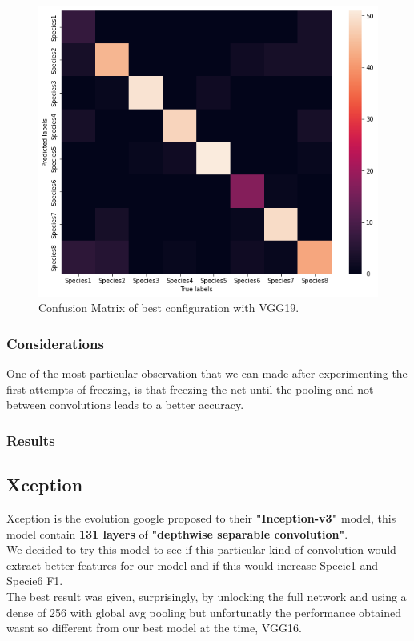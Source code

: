 \documentclass[10pt]{article}
\begin{document}
\begin{figure}[ht]
\begin{center}
\centerline{\includegraphics[width=\columnwidth]{VGG19_best}}
\caption{Confusion Matrix of best configuration with VGG19.}
\label{bayespic}
\end{center}
\end{figure}
\subsubsection{Considerations}
One of the most particular observation that we can made after experimenting the first attempts of freezing, is that freezing the net
until the pooling and not between convolutions leads to a better accuracy.

\subsubsection{Results}
\subsection{Xception}
Xception is the evolution google proposed to their \textbf{"Inception-v3"} model, this model contain \textbf{131 layers} of \textbf{"depthwise separable convolution"}.\\
We decided to try this model to see if this particular kind of convolution would extract better features for our model and if this would increase Specie1 and Specie6 F1.\\
The best result was given, surprisingly, by unlocking the full network and using a dense of 256 with global avg pooling but
unfortunatly the performance obtained wasnt so different from our best model at the time, VGG16.
\end{document}
